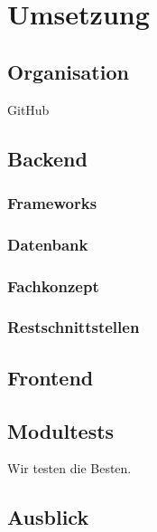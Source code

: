 \chapter{Umsetzung} \label{umsetzung}
	\section{Organisation}
	GitHub
	\section{Backend}
	
	\subsection{Frameworks}
	
	\subsection{Datenbank}
	
	\subsection{Fachkonzept}
	
	\subsection{Restschnittstellen}
	
	\section{Frontend}
	\section{Modultests}
	Wir testen die Besten.
	\section{Ausblick}
